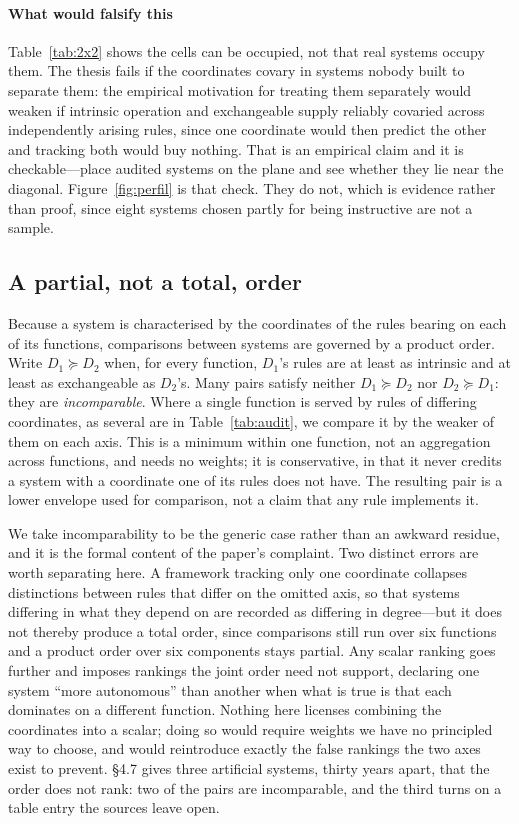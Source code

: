 \documentclass[review,3p,times]{elsarticle}
\begin{document}
\paragraph{What would falsify this}
Table~\ref{tab:2x2} shows the cells can be occupied, not that real systems
occupy them. The thesis fails if the coordinates covary in systems nobody
built to separate them: the empirical motivation for treating them separately
would weaken if intrinsic operation and exchangeable supply reliably covaried
across independently arising rules, since one coordinate would then predict
the other and tracking both would buy nothing. That is an empirical claim and
it is checkable---place
audited systems on the plane and see whether they lie near the diagonal.
Figure~\ref{fig:perfil} is that check. They do not, which is evidence rather
than proof, since eight systems chosen partly for being instructive are not a
sample.

\subsection{A partial, not a total, order}

Because a system is characterised by the coordinates of the rules bearing
on each of its functions, comparisons between systems are governed by a
product order. Write $D_1 \succeq D_2$ when, for every function, $D_1$'s
rules are at least as intrinsic and at least as exchangeable as $D_2$'s.
Many pairs satisfy neither $D_1 \succeq D_2$ nor $D_2 \succeq D_1$: they are
\emph{incomparable}. Where a single function is served by rules of differing
coordinates, as several are in Table~\ref{tab:audit}, we compare it by the
weaker of them on each axis. This is a minimum within one function, not an
aggregation across functions, and needs no weights; it is conservative, in
that it never credits a system with a coordinate one of its rules does not
have. The resulting pair is a lower envelope used for comparison, not a claim
that any rule implements it.

We take incomparability to be the generic case rather than an awkward
residue, and it is the formal content of the paper's complaint. Two distinct
errors are worth separating here. A framework tracking only one coordinate
collapses distinctions between rules that differ on the omitted axis, so that
systems differing in what they depend on are recorded as differing in
degree---but it does not thereby produce a total order, since comparisons
still run over six functions and a product order over six components stays
partial. Any scalar ranking goes further and imposes rankings the joint order
need not support, declaring one system ``more autonomous'' than another when
what is true is that each dominates on a different function. Nothing here
licenses combining the coordinates into a scalar; doing so would require
weights we have no principled way to choose, and would reintroduce exactly the
false rankings the two axes exist to prevent. \S4.7 gives three artificial systems, thirty years apart,
that the order does not rank: two of the pairs are incomparable, and the
third turns on a table entry the sources leave open.
\end{document}
